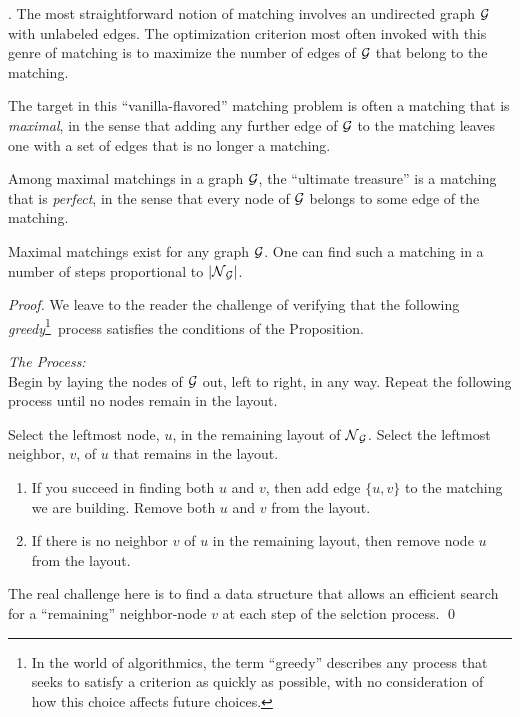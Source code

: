 \noindent {}
\bigskip

.
The most straightforward notion of matching involves an undirected
graph $\mbox{$\cal G$}$ with unlabeled edges.  The optimization criterion most
often invoked with this genre of matching is to maximize the number of
edges of $\mbox{$\cal G$}$ that belong to the matching.

The target in this ``vanilla-flavored'' matching problem is often a
matching that is {\em maximal}, 
 in the sense that
adding any further edge of $\mbox{$\cal G$}$ to the matching leaves one with a set
of edges that is no longer a matching.

Among maximal matchings in a graph $\mbox{$\cal G$}$, the ``ultimate treasure'' is
a matching that is {\it perfect},  in
the sense that every node of $\mbox{$\cal G$}$ belongs to some edge of the
matching.

\begin{prop}
\label{thm:max-matching}
Maximal matchings exist for any graph $\mbox{$\cal G$}$.  One can find such a
matching in a number of steps proportional to $|\mbox{$\cal N$}_{\mbox{{\scriptsize $\cal G$}}}|$.
\end{prop}

\begin{proof}
We leave to the reader the challenge of verifying that the following
 {\em greedy}\footnote{In the world of
  algorithmics, the term ``greedy'' describes any process that seeks to
  satisfy a criterion as quickly as possible, with no consideration of
  how this choice affects future choices.}~process satisfies the
conditions of the Proposition.

\noindent
{\it The Process:} \\
Begin by laying the nodes of $\mbox{$\cal G$}$ out, left to right, in any way.
Repeat the following process until no nodes remain in the layout.

\noindent
Select the leftmost node, $u$, in the remaining layout of $\mbox{$\cal N$}_{\mbox{{\scriptsize $\cal G$}}}$.
Select the leftmost neighbor, $v$, of $u$ that remains in the layout.
  \begin{enumerate}
  \item
If you succeed in finding both $u$ and $v$, then add edge $\{u,v\}$ to
the matching we are building.  Remove both $u$ and $v$ from the
layout.
  \item
If there is no neighbor $v$ of $u$ in the remaining layout, then
remove node $u$ from the layout.
  \end{enumerate}
The real challenge here is to find a data structure that allows an
efficient search for a ``remaining'' neighbor-node $v$ at each step of
the selction process.
\qed
\end{proof}

